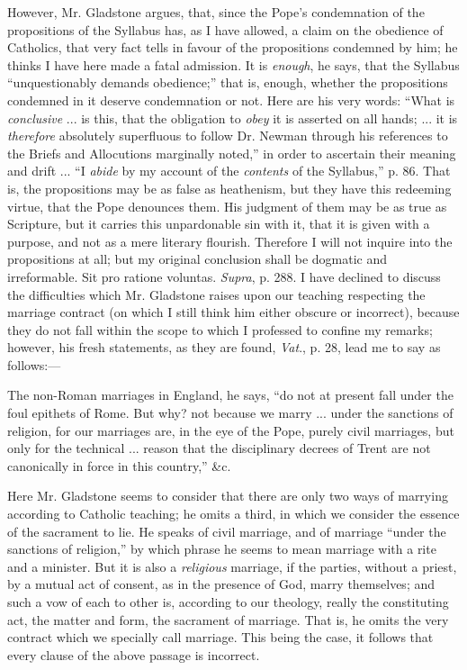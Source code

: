 However, Mr. Gladstone argues, that, since the Pope's condemnation of
the propositions of the Syllabus has, as I have allowed, a claim on the
obedience of Catholics, that very fact tells in favour of the
propositions condemned by him; he thinks I have here made a fatal
admission. It is \emph{enough}, he says, that the Syllabus
``unquestionably demands obedience;'' that is, enough, whether
the propositions condemned in it deserve condemnation or not. Here are
his very words: ``What is \emph{conclusive} ... is this, that the
obligation to \emph{obey} it is asserted on all hands; ... it is \emph{therefore}
absolutely superfluous to follow Dr. Newman through his references to
the Briefs and Allocutions marginally noted,'' in order to ascertain
their meaning and drift ... ``I \emph{abide} by my account of the \emph{contents}
of the Syllabus,'' p. 86. That is, the propositions may be as false
as heathenism, but they have this redeeming virtue, that the Pope
denounces them. His judgment of them may be as true as Scripture, but it
carries this unpardonable sin with it, that it is given with a purpose,
and not as a mere literary flourish. Therefore I will not inquire into
the propositions at all; but my original conclusion shall be dogmatic
and irreformable. Sit pro ratione voluntas.
\emph{Supra}, p. 288. I have declined to discuss the difficulties which
Mr. Gladstone raises upon our teaching respecting the marriage
contract (on which I still think him either obscure or incorrect),
because they do not fall within the scope to which I professed to
confine my remarks; however, his fresh statements, as they are found, \emph{Vat}.,
p. 28, lead me to say as follows:—

The non-Roman marriages in England, he says, ``do not at present
fall under the foul epithets of Rome. But why? not because we marry ...
under the sanctions of religion, for our marriages are, in the eye of
the Pope, purely civil marriages, but only for the technical ... reason that
the disciplinary decrees of Trent are not canonically in force in this
country,'' \&c.

Here Mr. Gladstone seems to consider that there are only two ways of
marrying according to Catholic teaching; he omits a third, in which we
consider the essence of the sacrament to lie. He speaks of civil
marriage, and of marriage ``under the sanctions of religion,''
by which phrase he seems to mean marriage with a rite and a minister.
But it is also a \emph{religious} marriage, if the parties, without a priest,
by a mutual act of consent, as in the presence of God, marry themselves;
and such a vow of each to other is, according to our theology, really
the constituting act, the matter and form, the sacrament of marriage.
That is, he omits the very contract which we specially call marriage.
This being the case, it follows that every clause of the above passage
is incorrect.

